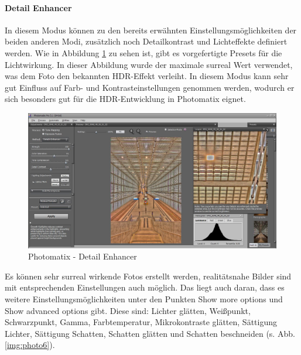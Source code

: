 \documentclass[liststotoc,bibtotoc,fontsize=14pt,]{scrreprt}
\begin{document}
		\paragraph{Detail Enhancer} In diesem Modus können zu den bereits erwähnten Einstellungsmöglichkeiten der beiden anderen Modi, zusätzlich noch Detailkontrast und Lichteffekte definiert werden. Wie in Abbildung \ref{img:photo3} zu sehen ist, gibt es vorgefertigte Presets für die Lichtwirkung. In dieser Abbildung wurde der maximale surreal Wert verwendet, was dem Foto den bekannten HDR-Effekt verleiht.
		In diesem Modus kann sehr gut Einfluss auf Farb- und Kontrasteinstellungen genommen werden, wodurch er sich besonders gut für die HDR-Entwicklung in Photomatix eignet. 
		
		\bigskip
		\begin{figure}[H]
			\includegraphics[width=\linewidth]{img/photo3.jpg}
			\caption{Photomatix - Detail Enhancer}
			\label{img:photo3}
		\end{figure}
	
		Es können sehr surreal wirkende Fotos erstellt werden, realitätsnahe Bilder sind mit entsprechenden Einstellungen auch möglich. Das liegt auch daran, dass es weitere Einstellungsmöglichkeiten unter den Punkten \grqq{}Show more options\grqq{} und \grqq{}Show advanced options\grqq{} gibt. Diese sind: Lichter glätten, Weißpunkt,	Schwarzpunkt, Gamma, Farbtemperatur, Mikrokontraste glätten, Sättigung Lichter, Sättigung Schatten, Schatten glätten und Schatten beschneiden (s. Abb. \ref{img:photo6}).
		
\end{document}
